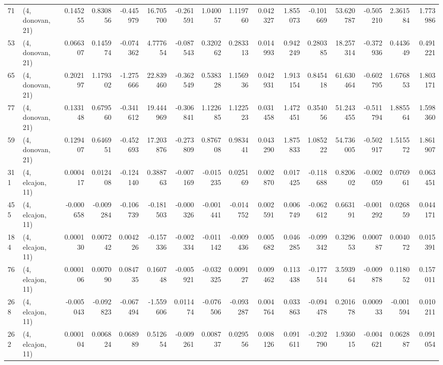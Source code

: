 \begin{tabular}{llrrrrrrrrrrrrrr}
71  &  (4, donovan, 21) &   0.145255 &  0.830856 & -0.445979 &   16.705700 & -0.261591 &   1.040057 &  1.119760 &  0.042327 &  1.855073 & -0.101669 &   53.620787 & -0.505210 &  2.361584 &  1.773986 \\
53  &  (4, donovan, 21) &   0.066307 &  0.145974 & -0.074362 &    4.777654 & -0.087543 &   0.320262 &  0.283313 &  0.014993 &  0.942249 &  0.280385 &   18.257314 & -0.372936 &  0.443649 &  0.491221 \\
65  &  (4, donovan, 21) &   0.202197 &  1.179302 & -1.275666 &   22.839460 & -0.362549 &   0.538328 &  1.156936 &  0.042931 &  1.913154 &  0.845418 &   61.630464 & -0.602795 &  1.676853 &  1.803171 \\
77  &  (4, donovan, 21) &   0.133148 &  0.679560 & -0.341612 &   19.444969 & -0.306841 &   1.122685 &  1.122523 &  0.031458 &  1.472451 &  0.354056 &   51.243455 & -0.511794 &  1.885564 &  1.598360 \\
59  &  (4, donovan, 21) &   0.129407 &  0.646951 & -0.452693 &   17.203876 & -0.273809 &   0.876708 &  0.983441 &  0.043290 &  1.875833 &  1.085222 &   54.736005 & -0.502917 &  1.515572 &  1.861907 \\
311 &  (4, elcajon, 11) &   0.000417 &  0.012408 & -0.124140 &    0.388763 & -0.007169 &  -0.015235 &  0.025169 &  0.002870 &  0.017425 & -0.118688 &    0.820602 & -0.002059 &  0.076961 &  0.063451 \\
455 &  (4, elcajon, 11) &  -0.000658 & -0.009284 & -0.106739 &   -0.181503 & -0.000326 &  -0.001441 & -0.014752 &  0.002591 &  0.006749 & -0.062612 &    0.663191 & -0.001292 &  0.026859 &  0.044171 \\
184 &  (4, elcajon, 11) &   0.000130 &  0.007242 &  0.004226 &   -0.157336 & -0.002334 &  -0.011142 & -0.009436 &  0.005682 &  0.046285 & -0.099342 &    0.329653 &  0.000787 &  0.004072 &  0.015391 \\
76  &  (4, elcajon, 11) &   0.000106 &  0.007090 &  0.084735 &    0.160748 & -0.005921 &  -0.032325 &  0.009127 &  0.009462 &  0.113438 & -0.177514 &    3.593964 & -0.009878 &  0.118052 &  0.157011 \\
268 &  (4, elcajon, 11) &  -0.005043 & -0.092823 & -0.067494 &   -1.559606 &  0.011474 &  -0.076506 & -0.093287 &  0.004764 &  0.033863 & -0.094478 &    0.201678 &  0.000933 & -0.001594 &  0.010211 \\
262 &  (4, elcajon, 11) &   0.000104 &  0.006824 &  0.068989 &    0.512654 & -0.009261 &   0.008737 &  0.029556 &  0.008126 &  0.091611 & -0.202790 &    1.936015 & -0.004621 &  0.062887 &  0.091054 \\

\end{tabular}
